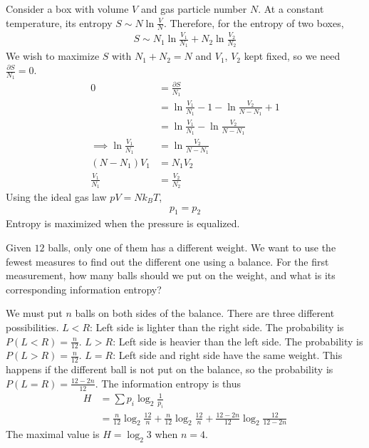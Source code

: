 \documentclass[12pt]{book} %
\numberwithin{equation}{chapter}
\def\p{\partial}
\begin{document}
\begin{solbox}
Consider a box with volume $V$ and gas particle number $N$. At a constant temperature, its entropy $S\sim N\ln\frac{V}{N}$. Therefore, for the entropy of two boxes,
\begin{align*}
S\sim N_{1}\ln\frac{V_{1}}{N_{1}}+N_{2}\ln\frac{V_{2}}{N_{2}}
\end{align*}
We wish to maximize $S$ with $N_{1}+N_{2}=N$ and $V_{1}$, $V_{2}$ kept fixed, so we need $\frac{\p S}{N_{1}}=0$.
\begin{align*}
0&=\frac{\p S}{N_{1}}\\
&=\ln\frac{V_{1}}{N_{1}}-1-\ln\frac{V_{2}}{N-N_{1}}+1\\
&=\ln\frac{V_{1}}{N_{1}}-\ln\frac{V_{2}}{N-N_{1}}\\
\implies \ln\frac{V_{1}}{N_{1}}&=\ln \frac{V_{2}}{N-N_{1}}\\
\left(N-N_{1}\right)V_{1}&=N_{1}V_{2}\\
\frac{V_{1}}{N_{1}}&=\frac{V_{2}}{N_{2}}
\end{align*}
Using the ideal gas law $pV=Nk_{B}T$,
\begin{align*}
p_{1}=p_{2}
\end{align*}
Entropy is maximized when the pressure is equalized.
\end{solbox}

\begin{problem}
Given $12$ balls, only one of them has a different weight. We want to use the fewest measures to find out the different one using a balance. For the first measurement, how many balls should we put on the weight, and what is its corresponding information entropy?
\end{problem}

\begin{solbox}
We must put $n$ balls on both sides of the balance. There are three different possibilities.\bigskip\newline
$L<R$: Left side is lighter than the right side. The probability is $P(L<R)=\frac{n}{12}$.\bigskip\newline
$L>R$: Left side is heavier than the left side. The probability is $P(L>R)=\frac{n}{12}$.\bigskip\newline
$L=R$: Left side and right side have the same weight. This happens if the different ball is not put on the balance, so the probability is $P(L=R)=\frac{12-2n}{12}$.\bigskip\newline
The information entropy is thus
\begin{align*}
H&=\sum p_{i}\log_{2}\frac{1}{p_{i}}\\
&=\frac{n}{12}\log_{2}\frac{12}{n}+\frac{n}{12}\log_{2}\frac{12}{n}+\frac{12-2n}{12}\log_{2}\frac{12}{12-2n}
\end{align*}
The maximal value is $H=\log_{2}3$ when $n=4$.
\end{solbox}
\end{document}
